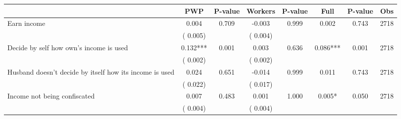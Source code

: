 
\begin{tabular}{l*{7}{c}}\hline&\multicolumn{1}{c}{PWP}&\multicolumn{1}{c}{P-value}&\multicolumn{1}{c}{Workers}&\multicolumn{1}{c}{P-value}&\multicolumn{1}{c}{Full}&\multicolumn{1}{c}{P-value}&\multicolumn{1}{c}{Obs} \\ \hline

 Earn income       &              0.004       &        0.709  &             -0.003       &        0.999  &              0.002       &              0.743 &  2718 \\ 
                       &       (       0.005)             &                               &       (       0.004)                     &                               &                                               &                                &                      \\ 

 Decide by self how own's income is used       &              0.132***       &        0.001  &              0.003       &        0.636  &              0.086***       &              0.001 &  2718 \\ 
                       &       (       0.002)             &                               &       (       0.002)                     &                               &                                               &                                &                      \\ 

 Husband doesn't decide by itself how its income is used       &              0.024       &        0.651  &             -0.014       &        0.999  &              0.011       &              0.743 &  2718 \\ 
                       &       (       0.022)             &                               &       (       0.017)                     &                               &                                               &                                &                      \\ 

 Income not being confiscated       &              0.007       &        0.483  &              0.001       &        1.000  &              0.005*       &              0.050 &  2718 \\ 
                       &       (       0.004)             &                               &       (       0.004)                     &                               &                                               &                                &                      \\ 


\end{tabular}
